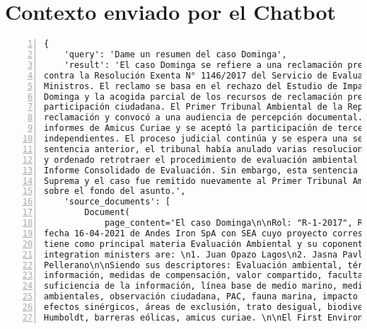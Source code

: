 \chapter{Contexto enviado por el Chatbot}\label{appx:output}

\begin{Verbatim}[frame=lines, label=Elavoración propia -  Ejemplo de Contexto enviado por el Chatbot a OpenAI
				, fontsize=\footnotesize, numbers=left
				, baselinestretch=0.4
				, formatcom=\color{gray}]
{
    'query': 'Dame un resumen del caso Dominga',
    'result': 'El caso Dominga se refiere a una reclamación presentada por Andes Iron SpA
contra la Resolución Exenta N° 1146/2017 del Servicio de Evaluación Ambiental y el Comité de
Ministros. El reclamo se basa en el rechazo del Estudio de Impacto Ambiental del proyecto
Dominga y la acogida parcial de los recursos de reclamación presentados en el marco de la
participación ciudadana. El Primer Tribunal Ambiental de la República de Chile admitió la
reclamación y convocó a una audiencia de percepción documental. Además, se presentaron
informes de Amicus Curiae y se aceptó la participación de terceros coadyuvantes e
independientes. El proceso judicial continúa y se espera una sentencia definitiva. En una
sentencia anterior, el tribunal había anulado varias resoluciones relacionadas con el proyecto
y ordenado retrotraer el procedimiento de evaluación ambiental a una etapa posterior al
Informe Consolidado de Evaluación. Sin embargo, esta sentencia fue anulada por la Corte
Suprema y el caso fue remitido nuevamente al Primer Tribunal Ambiental para que se pronuncie
sobre el fondo del asunto.',
    'source_documents': [
        Document(
            page_content='El caso Dominga\n\nRol: "R-1-2017", Rol: "R-1-2017",Rol: "R-1-2017",
fecha 16-04-2021 de Andes Iron SpA con SEA cuyo proyecto corresponde a Dominga. Este caso
tiene como principal materia Evaluación Ambiental y su coponente ambiental es Agua\n\nThe
integration ministers are: \n1. Juan Opazo Lagos\n2. Jasna Pavlich Núñez\n3. Fabrizio Queirolo
Pellerano\n\nSiendo sus descriptores: Evaluación ambiental, término anticipado, suficiencia de
información, medidas de compensación, valor compartido, facultades del Comité de Ministros,
suficiencia de la información, línea base de medio marino, medida voluntaria, riesgos
ambientales, observación ciudadana, PAC, fauna marina, impacto de ruidos, rutas de navegación,
efectos sinérgicos, áreas de exclusión, trato desigual, biodiversidad marina, pingüino
Humboldt, barreras eólicas, amicus curiae. \n\nEl First Environmental Court Acoge la causa en

\end{Verbatim}
